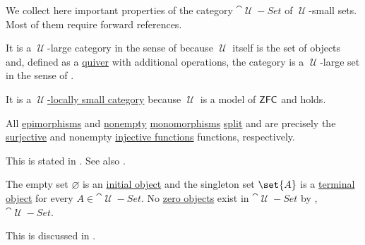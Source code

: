 \begin{proposition}\label{thm:category_of_small_sets_properites}
  We collect here important properties of the category \hyperref[def:category_of_small_sets]{\( \cat{\mscrU-Set} \)} of \( \mscrU \)-small sets. Most of them require forward references.

  \begin{thmenum}
     It is a \( \mscrU \)-large category in the sense of  because \( \mscrU \) itself is the set of objects and, defined as a \hyperref[def:graph/quiver]{quiver} with additional operations, the category is a \( \mscrU \)-large set in the sense of .

     It is a \hyperref[def:category_size]{\( \mscrU \)-locally small category} because \( \mscrU \) is a model of \hyperref[def:zfc]{\( \textsf{ZFC} \)} and  holds.

     All \hyperref[def:morphism_invertibility/right_cancellative]{epimorphisms} and \hyperref[def:multi_valued_function/empty]{nonempty} \hyperref[def:morphism_invertibility/left_cancellative]{monomorphisms} \hyperref[def:morphism_invertibility/left_invertible]{split} and are precisely the \hyperref[def:function_invertibility/surjective]{surjective} and nonempty \hyperref[def:function_invertibility/injective]{injective functions} functions, respectively.

    This is stated in . See also .

     The empty set \( \varnothing \) is an \hyperref[def:zero_objects/initial]{initial object} and the singleton set \( \set{ A } \) is a \hyperref[def:zero_objects/terminal]{terminal object} for every \( A \in \cat{\mscrU-Set} \). No \hyperref[def:zero_objects/zero]{zero objects} exist in \( \cat{\mscrU-Set} \) by , \( \cat{\mscrU-Set} \).

    This is discussed in .
  \end{thmenum}
\end{proposition}

